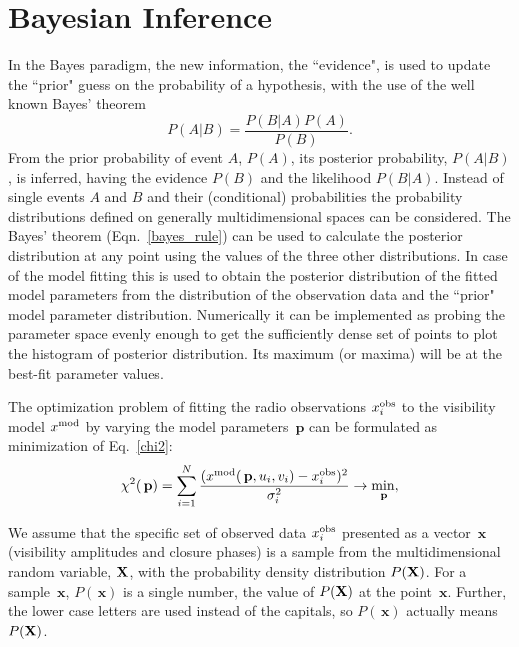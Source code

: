 \documentclass[preprint2]{aastex}
\newcommand{\bfp}{\,\mathbf{p}}
\newcommand{\bfx}{\,\mathbf{x}}
\begin{document}
\section{Bayesian Inference}\label{bayesian}

In the Bayes paradigm, the new information, the ``evidence", is used to update the ``prior" guess on the probability of a hypothesis, with the use of the well known Bayes' theorem
\begin{equation}
  \label{bayes_rule}
  P(A|B) =  \frac{P(B|A)P(A)}{P(B)}.
\end{equation}
From the prior probability of event $A$, $P(A)$, its posterior probability, $P(A|B)$, is inferred, having the evidence $P(B)$ and the likelihood $P(B|A)$. Instead of single events $A$ and $B$ and their (conditional) probabilities the probability distributions defined on generally multidimensional spaces can be considered. The Bayes' theorem (Eqn.~\eqref{bayes_rule}) can be used to calculate the posterior distribution at any point using the values of the three other distributions. In case of the model fitting this is used to obtain the posterior distribution of the fitted model parameters from the distribution of the observation data and the ``prior" model parameter distribution. Numerically it can be implemented as  probing the parameter space evenly enough to get the sufficiently dense set of points to plot the histogram of posterior distribution. Its maximum (or maxima) will be at the best-fit parameter values.

The optimization problem of fitting the radio observations $x_i^{\rm obs}$ to the visibility model $x^{\rm mod}$ by varying the model parameters $\bfp$ can be formulated as minimization of Eq.~\eqref{chi2}:
\begin{equation*}
  \label{chi2_nonumber}
  \chi^2(\bfp) = \sum_{i=1}^{N} \frac{(x^{\rm mod}(\bfp,u_i,v_i) - x_i^{\rm obs})^2}{\sigma_i^2}  \rightarrow {\min\limits_{\bfp}},
\end{equation*}

We assume that the specific set of observed data $x_i^{\rm obs}$ presented as a vector $\bfx$ (visibility amplitudes and closure phases) is a sample from the multidimensional random variable, ${\bf X}$, with the probability density distribution $P({\bf X})$. For a sample $\bfx$, $P(\bfx)$ is a single number, the value of $P({\bf X})$ at the point $\bfx$. Further, the lower case letters are used instead of the capitals, so $P(\bfx)$ actually means $P({\bf X})$.
\end{document}
